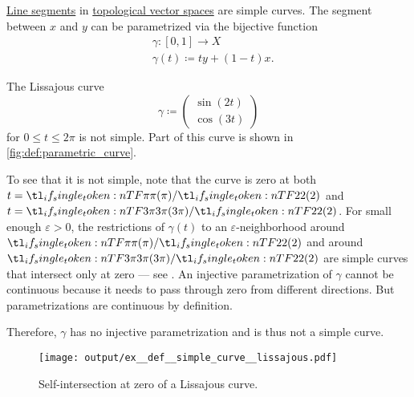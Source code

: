 \begin{example}\label{ex:def:simple_curve}
  \hfill
  \begin{thmenum}
     \hyperref[def:line_segment]{Line segments} in \hyperref[def:topological_vector_space]{topological vector spaces} are simple curves. The segment between \( x \) and \( y \) can be parametrized via the bijective function
    \begin{equation*}
      \begin{aligned}
        &\gamma: [0, 1] \to X \\
        &\gamma(t) \coloneqq ty + (1 - t)x.
      \end{aligned}
    \end{equation*}

     The Lissajous curve
    \begin{equation*}
      \gamma \coloneqq \begin{pmatrix} \sin(2t) \\ \cos(3t) \end{pmatrix}
    \end{equation*}
    for \( 0 \leq t \leq 2\pi \) is not simple. Part of this curve is shown in \cref{fig:def:parametric_curve}.

    To see that it is not simple, note that the curve is zero at both \( t = \ifrac \pi 2 \) and \( t = \ifrac {3\pi} 2 \). For small enough \( \varepsilon > 0 \), the restrictions of \( \gamma(t) \) to an \( \varepsilon \)-neighborhood around \( \ifrac \pi 2 \) and around \( \ifrac {3\pi} 2 \) are simple curves that intersect only at zero --- see . An injective parametrization of \( \gamma \) cannot be continuous because it needs to pass through zero from different directions. But parametrizations are continuous by definition.

    Therefore, \( \gamma \) has no injective parametrization and is thus not a simple curve.

    \begin{figure}[!ht]
      \centering
      \texttt{[image: output/ex\_\_def\_\_simple\_curve\_\_lissajous.pdf]}
      \caption{Self-intersection at zero of a Lissajous curve.}\label{fig:ex:def:simple_curve/lissajous}
    \end{figure}
  \end{thmenum}
\end{example}

